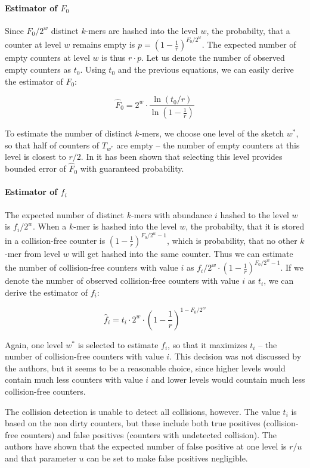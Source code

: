 \paragraph{Estimator of $F_0$}
Since $F_0 / 2^w$ distinct $k$-mers are hashed into the level $w$, the probabilty, that a counter at level $w$ remains empty
is $p = (1 - \frac{1}{r})^{F_0/2^w}$. The expected number of empty counters at level $w$ is thus $r \cdot p$. Let us denote the
number of observed empty counters as $t_0$. Using $t_0$ and the previous equations, we can easily derive the estimator of $F_0$:

$$ \hat F_0 = 2^w \cdot \frac{\ln(t_0/r)}{\ln\left(1 - \frac{1}{r}\right)} $$

To estimate the number of distinct $k$-mers, we choose one level of the sketch $w^*$, so that half of counters of $T_{w^*}$ are empty
-- the number of empty counters at this level is closest to $r/2$. In \cite{Melsted2014} it has been shown that selecting this level
provides bounded error of $\hat F_0$ with guaranteed probability.

\paragraph{Estimator of $f_i$}
The expected number of distinct $k$-mers with abundance $i$ hashed to the level $w$ is $f_i / 2^w$.
When a $k$-mer is hashed into the level $w$, the probabilty, that it is stored in a collision-free counter
is $(1 - \frac{1}{r})^{F_0/2^w - 1}$, which is probability, that no other $k$-mer from level $w$ will get hashed into the same counter.
Thus we can estimate the number of collision-free counters with value $i$ as  $f_i / 2^w \cdot (1 - \frac{1}{r})^{F_0/2^w - 1}$.
If we denote the number of observed collision-free counters with value $i$ as $t_i$, we can derive the estimator of $f_i$:

$$ \hat f_i = t_i \cdot 2^w \cdot \left(1 - \frac{1}{r}\right)^{1 - F_0/2^w} $$

Again, one level $w^*$ is selected to estimate $f_i$, so that it maximizes $t_i$ -- the number of collision-free counters with value $i$.
This decision was not discussed by the authors, but it seems to be a reasonable choice, since higher levels would contain much
less counters with value $i$ and lower levels would countain much less collision-free counters.

The collision detection is unable to detect all collisions, however. The value $t_i$ is based on the non dirty counters, 
but these include both true positives (collision-free counters) and false positives (counters with undetected collision).
The authors have shown that the expected number of false positive at one level is $r/u$ \cite{Sivadasan2016} and that 
parameter $u$ can be set to make false positives negligible.

